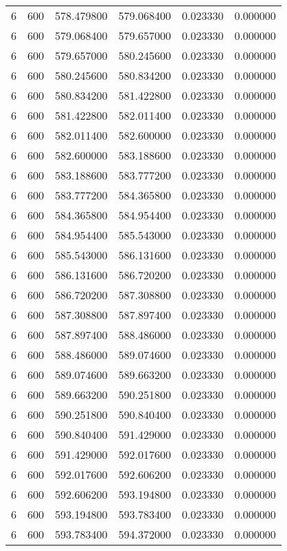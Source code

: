 \begin{longtable}{rrrrrr}
6 & 600 & 578.479800 & 579.068400 & 0.023330 & 0.000000 \\
6 & 600 & 579.068400 & 579.657000 & 0.023330 & 0.000000 \\
6 & 600 & 579.657000 & 580.245600 & 0.023330 & 0.000000 \\
6 & 600 & 580.245600 & 580.834200 & 0.023330 & 0.000000 \\
6 & 600 & 580.834200 & 581.422800 & 0.023330 & 0.000000 \\
6 & 600 & 581.422800 & 582.011400 & 0.023330 & 0.000000 \\
6 & 600 & 582.011400 & 582.600000 & 0.023330 & 0.000000 \\
6 & 600 & 582.600000 & 583.188600 & 0.023330 & 0.000000 \\
6 & 600 & 583.188600 & 583.777200 & 0.023330 & 0.000000 \\
6 & 600 & 583.777200 & 584.365800 & 0.023330 & 0.000000 \\
6 & 600 & 584.365800 & 584.954400 & 0.023330 & 0.000000 \\
6 & 600 & 584.954400 & 585.543000 & 0.023330 & 0.000000 \\
6 & 600 & 585.543000 & 586.131600 & 0.023330 & 0.000000 \\
6 & 600 & 586.131600 & 586.720200 & 0.023330 & 0.000000 \\
6 & 600 & 586.720200 & 587.308800 & 0.023330 & 0.000000 \\
6 & 600 & 587.308800 & 587.897400 & 0.023330 & 0.000000 \\
6 & 600 & 587.897400 & 588.486000 & 0.023330 & 0.000000 \\
6 & 600 & 588.486000 & 589.074600 & 0.023330 & 0.000000 \\
6 & 600 & 589.074600 & 589.663200 & 0.023330 & 0.000000 \\
6 & 600 & 589.663200 & 590.251800 & 0.023330 & 0.000000 \\
6 & 600 & 590.251800 & 590.840400 & 0.023330 & 0.000000 \\
6 & 600 & 590.840400 & 591.429000 & 0.023330 & 0.000000 \\
6 & 600 & 591.429000 & 592.017600 & 0.023330 & 0.000000 \\
6 & 600 & 592.017600 & 592.606200 & 0.023330 & 0.000000 \\
6 & 600 & 592.606200 & 593.194800 & 0.023330 & 0.000000 \\
6 & 600 & 593.194800 & 593.783400 & 0.023330 & 0.000000 \\
6 & 600 & 593.783400 & 594.372000 & 0.023330 & 0.000000 \\

\end{longtable}
